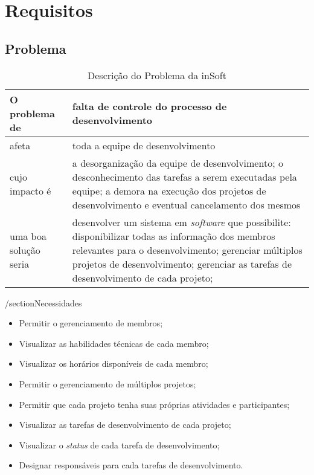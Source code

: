 \chapter{Requisitos}
\label{sec:requisitos}

\section{Problema}
    \begin{table}[H]
        \centering
        \begin{tabular}{|>{\columncolor[HTML]{C0C0C0}}p{}|p{}|}
          \hline
          O problema de         &   falta de controle do processo de desenvolvimento \\ \hline
          afeta                 &   toda a equipe de desenvolvimento                 \\ \hline
          cujo impacto é        &   a desorganização da equipe de desenvolvimento;
                                    o desconhecimento das tarefas a serem executadas pela equipe;
                                    a demora na execução dos projetos de desenvolvimento e eventual cancelamento dos mesmos                                         \\ \hline
          uma boa solução seria &   desenvolver um sistema em \emph{software} que possibilite:
                                    disponibilizar todas as informação dos membros relevantes para o desenvolvimento;
                                    gerenciar múltiplos projetos de desenvolvimento;
                                    gerenciar as tarefas de desenvolvimento de cada projeto;
                                    \\ \hline
        \end{tabular}
        \caption{Descrição do Problema da inSoft}
      \end{table}

/section{Necessidades}
    \begin{itemize}
      \item Permitir o gerenciamento de membros;
      \item Visualizar as habilidades técnicas de cada membro;
      \item Visualizar os horários disponíveis de cada membro;
      \item Permitir o gerenciamento de múltiplos projetos;
      \item Permitir que cada projeto tenha suas próprias atividades e participantes;
      \item Visualizar as tarefas de desenvolvimento de cada projeto;
      \item Visualizar o \emph{status} de cada tarefa de desenvolvimento;
      \item Designar responsáveis para cada tarefas de desenvolvimento.
    \end{itemize}
    
